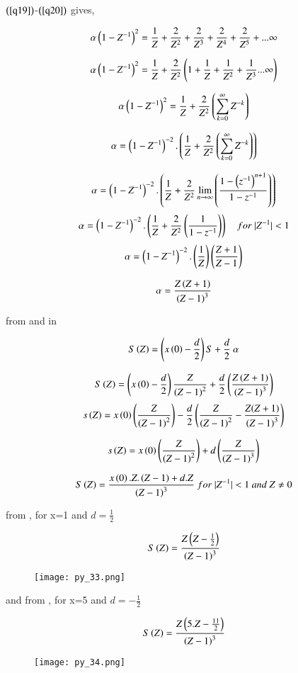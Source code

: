 \documentclass[beamer]{IEEEtran}
\theoremstyle{remark}
\begin{document}
$\left(\ref{q19}\right)$-$\left(\ref{q20}\right)$ gives,

$$\alpha\left(1-Z^{-1}\right)^2=\frac{1}{Z}+\frac{2}{Z^2}+\frac{2}{Z^3}+\frac{2}{Z^4}+\frac{2}{Z^5}+...\infty$$

$$\alpha\left(1-Z^{-1}\right)^2=\frac{1}{Z}+\frac{2}{Z^2}\left(1+\frac{1}{Z}+\frac{1}{Z^2}+\frac{1}{Z^3}...\infty\right)$$

$$\alpha\left(1-Z^{-1}\right)^2=\frac{1}{Z}+\frac{2}{Z^2}\left(\sum_{k=0}^{\infty}Z^{-k}\right)$$

$$
\alpha=\left(1-Z^{-1}\right)^{-2}.\left(\frac{1}{Z}+\frac{2}{Z^2}\left(\sum_{k=0}^{\infty}Z^{-k}\right)\right)
$$

$$
\alpha=\left(1-Z^{-1}\right)^{-2}.\left(\frac{1}{Z}+\frac{2}{Z^2}\lim_{n\to\infty}\left(\frac{1-\left(z^{-1}\right)^{n+1}}{1-z^{-1}}\right)\right)
$$
$$
\alpha=\left(1-Z^{-1}\right)^{-2}.\left(\frac{1}{Z}+\frac{2}{Z^2}\left(\frac{1}{1-z^{-1}}\right)\right)\quad for\ |Z^{-1}|<1
$$
$$\alpha=\left(1-Z^{-1}\right)^{-2}.\left(\frac{1}{Z}\right)\left(\frac{Z+1}{Z-1}\right)
$$

\begin{align}
\label{q22}
\alpha=\frac{Z\left(Z+1\right)}{\left(Z-1\right)^3}
\end{align}

from \brak{\ref{q16}} and \brak{\ref{q22}} in \brak{\ref{q17}}

$$
S\left(Z\right)=\left(x\left(0\right)-\frac{d}{2}\right) S+\frac{d}{2}\ \alpha
$$

$$
S\left(Z\right)=\left(x\left(0\right)-\frac{d}{2}\right)\frac{Z}{\left(Z-1\right)^2}+\frac{d}{2}\left(\frac{Z\left(Z+1\right)}{\left(Z-1\right)^3}\right)
$$
$$s\left(Z\right)=x\left(0\right)\left(\frac{Z}{\left(Z-1\right)^2}\right)-\frac{d}{2}\left(\frac{Z}{\left(Z-1\right)^2}-\frac{Z(Z+1)}{\left(Z-1\right)^3}\right)$$

$$s\left(Z\right)=x\left(0\right)\left(\frac{Z}{\left(Z-1\right)^2}\right)+d\left(\frac{Z}{\left(Z-1\right)^3}\right)$$

\begin{align}
\label{q23}
S\brak{Z}=\frac{x\brak{0}.Z.\brak{Z-1}+d.Z}{\brak{Z-1}^3}\ for\ |Z^{-1}|<1\ and\ Z\neq0
\end{align}

from \brak{\ref{q23}}, for x=1 and $d=\frac{1}{2}$

$$S\left(Z\right)=\frac{Z\left(Z-\frac{1}{2}\right)}{\left(Z-1\right)^3}$$

\begin{figure}[h]
    \centering
    \texttt{[image: py\_33.png]}
    \label{fig:enter-label}
\end{figure}

and from \brak{\ref{q23}}, for x=5 and $d=-\frac{1}{2}$

$$S\left(Z\right)=\frac{Z\left(5.Z-\frac{11}{2}\right)}{\left(Z-1\right)^3}$$

\begin{figure}[h]
    \centering
    \texttt{[image: py\_34.png]}
    \label{fig:enter-label}
\end{figure}
\end{document}
